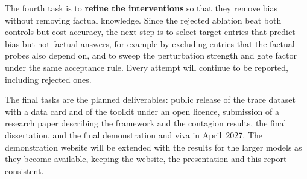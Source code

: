 The fourth task is to \textbf{refine the interventions} so that they remove bias without removing factual knowledge. Since the rejected ablation beat both controls but cost accuracy, the next step is to select target entries that predict bias but not factual answers, for example by excluding entries that the factual probes also depend on, and to sweep the perturbation strength and gate factor under the same acceptance rule. Every attempt will continue to be reported, including rejected ones.

The final tasks are the planned deliverables: public release of the trace dataset with a data card and of the toolkit under an open licence, submission of a research paper describing the framework and the contagion results, the final dissertation, and the final demonstration and viva in April~2027. The demonstration website will be extended with the results for the larger models as they become available, keeping the website, the presentation and this report consistent.
